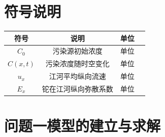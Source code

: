 \documentclass{whutmod}
\begin{document}
	\section{符号说明}

	\begin{table}[H]
	\label{biao} \centering
		\begin{tabular}{cccc}
			\toprule[1.5pt]
			\multicolumn{1}{m{4cm}}{\centering 符号} & \multicolumn{1}{m{4cm}}{\centering 说明} & \multicolumn{1}{m{4cm}}{\centering 单位}\\
			\midrule[1pt]
			$C_{0}$	 &  污染源初始浓度 & 单位\\ 
			$C(x,t)$ &  污染浓度随时空变化 & 单位\\ 
			$u_{x}$	 &  江河平均纵向流速 & 单位\\ 
			$E_{x}$  &  铊在江河纵向弥散系数& 单位\\ 
			\bottomrule[1.5pt]
		\end{tabular}
	\end{table}

	\section{问题一模型的建立与求解}
\end{document}
